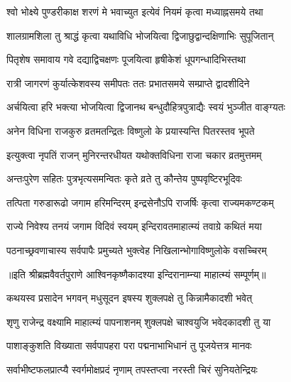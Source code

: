 \twolineshloka
{श्वो भोक्ष्ये पुण्डरीकाक्ष शरणं मे भवाच्युत}
{इत्येवं नियमं कृत्वा मध्याह्नसमये तथा} %

\twolineshloka
{शालग्रामशिला तु श्राद्धं कृत्वा यथाविधि}
{भोजयित्वा द्विजाछुद्वान्दक्षिणाभिः सुपूजितान्} %

\twolineshloka
{पितृशेष समावाय गवे दद्याद्विचक्षणः}
{पूजयित्वा हृषीकेशं धूपगन्धादिभिस्तथा} %

\twolineshloka
{रात्री जागरणं कुर्यात्केशवस्य समीपतः}
{ततः प्रभातसमये सम्प्राप्ते द्वादशीदिने} %

\twolineshloka
{अर्चयित्वा हरि भक्त्या भोजयित्वा द्विजानथ}
{बन्धुदौहित्रपुत्राद्यैः स्वयं भुञ्जीत वाङ्ग्यतः} %

\twolineshloka
{अनेन विधिना राजकुरु व्रतमतन्द्रितः}
{विष्णुलो के प्रयास्यन्ति पितरस्तव भूपते} %

\twolineshloka
{इत्युक्त्वा नृपतिं राजन् मुनिरन्तरधीयत}
{यथोक्तविधिना राजा चकार व्रतमुत्तमम्} %

\twolineshloka
{अन्तःपुरेण सहितः पुत्रभृत्यसमन्वितः}
{कृते व्रते तु कौन्तेय पुष्पवृष्टिरभूदिवः} %

\twolineshloka
{तत्पिता गरुडारूढो जगाम हरिमन्दिरम्}
{इन्द्रसेनौऽपि राजर्षिः कृत्वा राज्यमकण्टकम्} %

\twolineshloka
{राज्ये निवेश्य तनयं जगाम विदिवं स्वयम्}
{इन्दिरावतमाहात्म्यं तवाग्रे कथितं मया} %

\twolineshloka
{पठनाच्छ्रवणाचास्य सर्वपापैः प्रमुच्यते}
{भुक्त्वेह निखिलान्भोगाविष्णुलोके वसच्चिरम्} %

॥इति श्रीब्रह्मवैवर्तपुराणे आश्विनकृष्णैकादश्या इन्दिरानाम्न्या माहात्म्यं सम्पूर्णम्॥


\hyperref[sec:ekadashi_mahatmyam_vrata_raja]{\closesub}
\clearpage

\label{sec:vrata-raja-ashvina-shukla-pashankusha}


\twolineshloka
{कथयस्व प्रसादेन भगवन् मधुसूदन}
{इषस्य शुक्लपक्षे तु किन्नामैकादशी भवेत्} %


\twolineshloka
{शृणु राजेन्द्र वक्ष्यामि माहात्म्यं पापनाशनम्}
{शुक्लपक्षे चाश्वयुजि भवेदकादशी तु या} %

\twolineshloka
{पाशाङ्कुशति विख्याता सर्वपापहरा परा}
{पद्मनाभाभिधानं तु पूजयेत्तत्र मानवः} %

\twolineshloka
{सर्वाभीष्टफलप्रात्प्यै स्वर्गमोक्षप्रदं नृणाम्}
{तपस्तप्त्वा नरस्ती चिरं सुनियतेन्द्रियः} %

